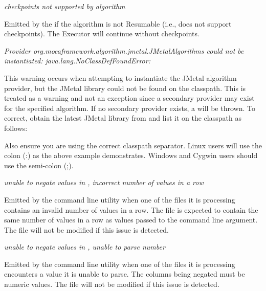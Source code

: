 \noindent
\textit{checkpoints not supported by algorithm}
\begin{indented}
  Emitted by the  if the algorithm is not Resumable (i.e., does not support checkpoints).  The Executor will continue without checkpoints.
\end{indented}
  
\noindent
\textit{Provider org.moeaframework.algorithm.jmetal.JMetalAlgorithms could not be instantiated: java.lang.NoClassDefFoundError: }
\begin{indented}
  This warning occurs when attempting to instantiate the JMetal algorithm provider, but the JMetal library could not be found on the classpath.  This is treated as a warning and not an exception since a secondary provider may exist for the specified algorithm.  If no secondary provider exists, a  will be thrown.  To correct, obtain the latest JMetal library from  and list it on the  classpath as follows:
  \begin{indented}
  \end{indented}
  Also ensure you are using the correct classpath separator.  Linux users will use the colon (:) as the above example demonstrates.  Windows and Cygwin users should use the
  semi-colon (;).
\end{indented}
    
\noindent
\textit{unable to negate values in , incorrect number of values in a row}
\begin{indented}
  Emitted by the  command line utility when one of the files it is processing contains an invalid number of values in a row.  The file is expected to contain the same number of values in a row as values passed to the  command line argument.  The file will not be modified if this issue is detected.
\end{indented}

\noindent
\textit{unable to negate values in , unable to parse number}
\begin{indented}
  Emitted by the  command line utility when one of the files it is processing encounters a value it is unable to parse.  The columns being negated must be numeric values.  The file will not be modified if this issue is detected.
\end{indented}

